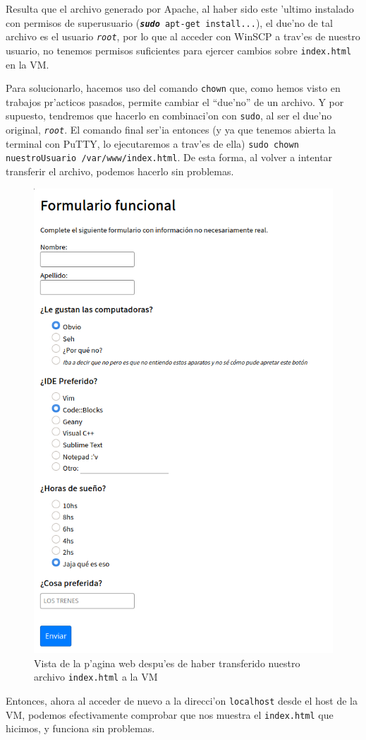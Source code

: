 \documentclass[11pt]{article}
\begin{document}
	Resulta que el archivo generado por Apache, al haber sido este 'ultimo instalado con permisos de superusuario (\texttt{\emph{\textbf{sudo}} apt-get install...}), el due'no de tal archivo es el usuario \texttt{\emph{root}}, por lo que al acceder con WinSCP a trav'es de nuestro usuario, no tenemos permisos suficientes para ejercer cambios sobre \texttt{index.html} en la VM.
	
	Para solucionarlo, hacemos uso del comando \texttt{chown} que, como hemos visto en trabajos pr'acticos pasados, permite cambiar el ``due'no'' de un archivo. Y por supuesto, tendremos que hacerlo en combinaci'on con \texttt{sudo}, al ser el due'no original, \texttt{\emph{root}}. El comando final ser'ia entonces (y ya que tenemos abierta la terminal con PuTTY, lo ejecutaremos a trav'es de ella)  \verb|sudo chown nuestroUsuario /var/www/index.html|. De esta forma, al volver a intentar transferir el archivo, podemos hacerlo sin problemas.
	
	\begin{figure}[H]
		\centering \captionsetup{justification=centering}
		\includegraphics[width=.55\linewidth]{Images/WinSCP/fig5}
		\caption{Vista de la p'agina web despu'es de haber transferido nuestro archivo \texttt{index.html} a la VM}
		\label{fig:index_ours_code}
	\end{figure}

	Entonces, ahora al acceder de nuevo a la direcci'on \texttt{localhost} desde el host de la VM, podemos efectivamente comprobar que nos muestra el \texttt{index.html} que hicimos, y funciona sin problemas.
\end{document}

